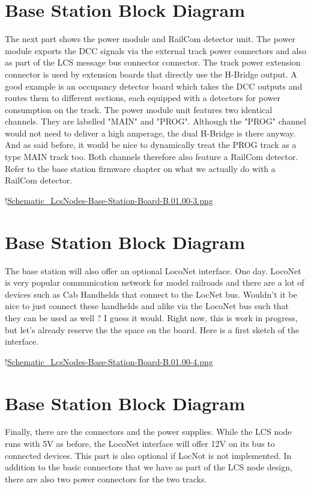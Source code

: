\section{Base Station Block Diagram}
The next part shows the power module and RailCom detector unit. The power module exports the DCC signals via the external track power connectors and also as part of the LCS message bus connector connector. The track power extension connector is used by extension boards that directly use the H-Bridge output. A good example is an occupancy detector board which takes the DCC outputs and routes them to different sections, each equipped with a detectors for power consumption on the track. The power module unit features two identical channels. They are labelled "MAIN" and "PROG". Although the "PROG" channel would not need to deliver a high amperage, the dual H-Bridge is there anyway. And as said before, it would be nice to dynamically treat the PROG track as a type MAIN track too. Both channels therefore also feature a RailCom detector. Refer to the base station firmware chapter on what we actually do with a RailCom detector.

!\href{./Schematics/Schematic_LcsNodes-Base-Station-Board-B.01.00-3.png }{Schematic_LcsNodes-Base-Station-Board-B.01.00-3.png}

\section{Base Station Block Diagram}
The base station will also offer an optional LocoNet interface. One day. LocoNet is very popular communication network for model railroads and there are a lot of devices such as Cab Handhelds that connect to the LocNet bus. Wouldn't it be nice to just connect these handhelds and alike via the LocoNet bus such that they can be used as well ? I guess it would. Right now, this is work in progress, but let's already reserve the the space on the board. Here is a first sketch of the interface.

!\href{./Schematics/Schematic_LcsNodes-Base-Station-Board-B.01.00-4.png }{Schematic_LcsNodes-Base-Station-Board-B.01.00-4.png}

\section{Base Station Block Diagram}
Finally, there are the connectors and the power supplies. While the LCS node runs with 5V as before, the LocoNet interface will offer 12V on its bus to connected devices. This part is also optional if LocNot is not implemented. In addition to the basic connectors that we have as part of the LCS node design, there are also two power connectors for the two tracks.


